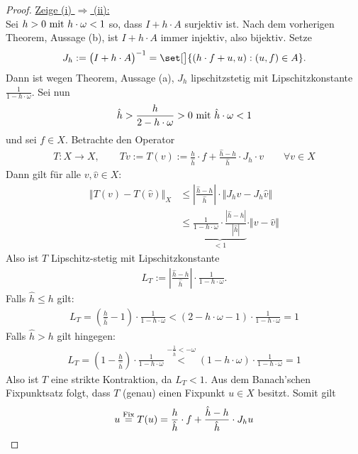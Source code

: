 \begin{proof}
	\underline{Zeige (i) $\Rightarrow$ (ii):}\\
	Sei $h>0\mit h\cdot\omega<1$ so, dass $I+h\cdot A$ surjektiv ist. 
	Nach dem vorherigen Theorem, Aussage (b), ist $I+h\cdot A$ immer injektiv, also bijektiv. 
	Setze
	\begin{align*}
		J_h:=\big(I+h\cdot A\big)^{-1}=\set[\big]{(h\cdot f+u,u):(u,f)\in A}.
	\end{align*}
	Dann ist wegen Theorem, Aussage (a), $J_h$ lipschitzstetig mit Lipschitzkonstante $\frac{1}{1-h\cdot\omega}$. 
	Sei nun 
	\begin{align*}
		\hat{h}>\frac{h}{2-h\cdot\omega}>0\mit\hat{h}\cdot\omega<1
	\end{align*}
	und sei $f\in X$. 
	Betrachte den Operator
	\begin{align*}
		T:X\to X,\qquad Tv:=T(v)
		:=\frac{h}{\hat{h}}\cdot f+\frac{\hat{h}-h}{\hat{h}}\cdot J_h\cdot v\qquad\forall v\in X
	\end{align*}
	Dann gilt für alle $v,\hat{v}\in X$:
	\begin{align*}
		\big\Vert T(v)-T(\hat{v})\big\Vert_X
		&\leq
		\left|\frac{\hat{h}-h}{\hat{h}}\right|\cdot\big\Vert J_h v-J_h \hat{v}\big\Vert\\
		&\leq
		\underbrace{\frac{1}{1-h\cdot\omega}\cdot\frac{|\hat{h}-h|}{|\hat{h}|}}_{<1}\cdot\Vert v-\hat{v}\Vert
		\end{align*}
	Also ist $T$ Lipschitz-stetig mit Lipschitzkonstante 
	\begin{align*}
		L_T:=\left|\frac{\hat{h}-h}{\hat{h}}\right|
		\cdot\frac{1}{1-h\cdot\omega}.
	\end{align*}
	Falls $\hat{h}\leq h$ gilt:
	\begin{align*}
		L_T=\left(\frac{h}{\hat{h}}-1\right)\cdot\frac{1}{1-h\cdot\omega}
		<
		(2-h\cdot\omega-1)\cdot\frac{1}{1-h\cdot\omega}
		=1
	\end{align*}
	Falls $\hat{h}>h$ gilt hingegen:
	\begin{align*}
		L_T=\left(1-\frac{h}{\hat{h}}\right)\cdot\frac{1}{1-h\cdot\omega}
		\stackrel{-\frac{1}{\hat{h}}<-\omega}{<}
		(1-h\cdot\omega)\cdot\frac{1}{1-h\cdot\omega}
		=1
	\end{align*}
	Also ist $T$ eine strikte Kontraktion, da $L_T<1$. 
	Aus dem Banach'schen Fixpunktsatz folgt, dass $T$ (genau) einen Fixpunkt $u\in X$ besitzt. 
	Somit gilt
	\begin{align*}
		u\stackeq{\text{Fix}}T(u)
		=\frac{h}{\hat{h}}\cdot f+\frac{\hat{h}-h}{\hat{h}}\cdot J_h u

\end{align*}
\end{proof}

